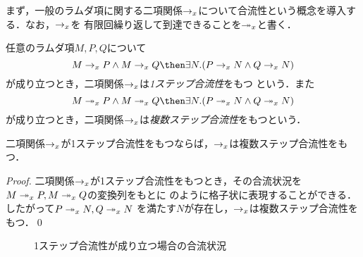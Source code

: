 \documentclass[uplatex,dvipdfmx,report,fleqn]{jsbook}
\begin{document}
まず，一般のラムダ項に関する二項関係$\rightarrow_x$について合流性という概念を導入する．なお，$\rightarrow_x$を
有限回繰り返して到達できることを$\twoheadrightarrow_x$と書く．
%
\begin{definition}[合流性]
任意のラムダ項$M,P,Q$について
\[
M \tox P \land M \tox Q \then \exists N.(P \tox N \land Q \tox N)
\]
が成り立つとき，二項関係$\rightarrow_x$は\emph{1ステップ合流性}をもつ
という．また
\[
M \toxs P \land M \toxs Q \then \exists N.(P \toxs N \land Q \toxs N)
\]
が成り立つとき，二項関係$\rightarrow_x$は\emph{複数ステップ合流性}をもつという．
\end{definition}
%
\begin{lemma}
二項関係$\rightarrow_x$が1ステップ合流性をもつならば，$\rightarrow_x$は複数ステップ合流性をもつ．
\end{lemma}
%
\begin{proof}
二項関係$\rightarrow_x$が1ステップ合流性をもつとき，その合流状況を$M\twoheadrightarrow_x P, M\twoheadrightarrow_x Q$の変換列をもとに
のように格子状に表現することができる．したがって$P \twoheadrightarrow_x N, Q \twoheadrightarrow_x N$
を満たす$N$が存在し，$\rightarrow_x$は複数ステップ合流性をもつ．\qed
\end{proof}
%
\begin{figure}[b]
\centering
{}
\caption{1ステップ合流性が成り立つ場合の合流状況}
\end{figure}
\end{document}
